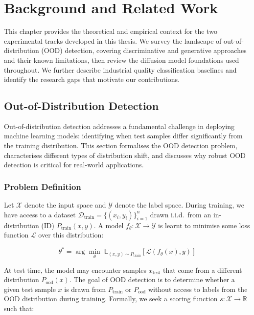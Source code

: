 \cleardoubleoddpage
\chapter{Background and Related Work}
\label{chap:background}
\begingroup
\fontsize{11pt}{13.2pt}\selectfont

This chapter provides the theoretical and empirical context for the two experimental tracks developed in this thesis. We survey the landscape of out-of-distribution (OOD) detection, covering discriminative and generative approaches and their known limitations, then review the diffusion model foundations used throughout. We further describe industrial quality classification baselines and identify the research gaps that motivate our contributions.
\section{Out-of-Distribution Detection}
\label{sec:bg:ood}

Out-of-distribution detection addresses a fundamental challenge in deploying machine learning models: identifying when test samples differ significantly from the training distribution. This section formalises the OOD detection problem, characterises different types of distribution shift, and discusses why robust OOD detection is critical for real-world applications.

\subsection{Problem Definition}
\label{sec:bg:ood:problem}

Let $\mathcal{X}$ denote the input space and $\mathcal{Y}$ denote the label space. During training, we have access to a dataset $\mathcal{D}_{\text{train}} = \{(x_i, y_i)\}_{i=1}^{n}$ drawn i.i.d.\ from an in-distribution (ID) $P_{\text{train}}(x, y)$. A model $f_\theta : \mathcal{X} \to \mathcal{Y}$ is learnt to minimise some loss function $\mathcal{L}$ over this distribution:

\begin{equation}
\label{eq:bg:loss}
\theta^* = \arg\min_\theta \; \mathbb{E}_{(x,y) \sim P_{\text{train}}} \left[ \mathcal{L}(f_\theta(x), y) \right]
\end{equation}

At test time, the model may encounter samples $x_{\text{test}}$ that come from a different distribution $P_{\text{ood}}(x)$. The goal of OOD detection is to determine whether a given test sample $x$ is drawn from $P_{\text{train}}$ or $P_{\text{ood}}$ without access to labels from the OOD distribution during training. Formally, we seek a scoring function $s : \mathcal{X} \to \mathbb{R}$ such that:

